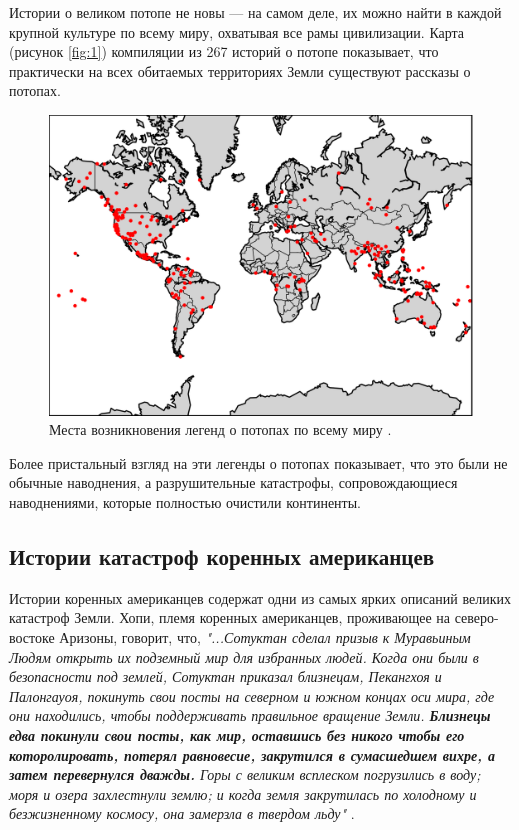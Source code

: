 \documentclass[10pt,twocolumn,letterpaper]{article}
\begin{document}
Истории о великом потопе не новы — на самом деле, их можно найти в каждой крупной культуре по всему миру, охватывая все рамы цивилизации. Карта (рисунок \ref{fig:1}) компиляции из 267 историй о потопе \cite{3} показывает, что практически на всех обитаемых территориях Земли существуют рассказы о потопах.

\begin{figure}[h]
\begin{center}
   \includegraphics[width=1\linewidth]{b.png}
\end{center}
   \caption{Места возникновения легенд о потопах по всему миру \cite{3}.}
\label{fig:1}
\label{fig:onecol}
\end{figure}

Более пристальный взгляд на эти легенды о потопах показывает, что это были не обычные наводнения, а разрушительные катастрофы, сопровождающиеся наводнениями, которые полностью очистили континенты.

\subsection{Истории катастроф коренных американцев}

Истории коренных американцев содержат одни из самых ярких описаний великих катастроф Земли. Хопи, племя коренных американцев, проживающее на северо-востоке Аризоны, говорит, что, \textit{"...Сотуктан сделал призыв к Муравьиным Людям открыть их подземный мир для избранных людей. Когда они были в безопасности под землей, Сотуктан приказал близнецам, Пекангхоя и Палонгауоя, покинуть свои посты на северном и южном концах оси мира, где они находились, чтобы поддерживать правильное вращение Земли. \textbf{Близнецы едва покинули свои посты, как мир, оставшись без никого чтобы его которолировать, потерял равновесие, закрутился в сумасшедшем вихре, а затем перевернулся дважды.} Горы с великим всплеском погрузились в воду; моря и озера захлестнули землю; и когда земля закрутилась по холодному и безжизненному космосу, она замерзла в твердом льду"} \cite{4}.
\end{document}
